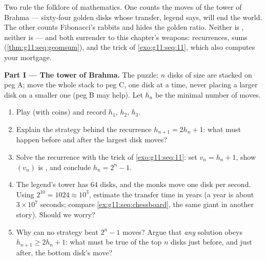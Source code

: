 \begin{problem}
\label{pb:g11:seq:1}
Two  rule the folklore of mathematics. One counts the
moves of the tower of Brahma --- sixty-four golden disks whose
transfer, legend says, will end the world. The other counts
Fibonacci's rabbits and hides the golden ratio. Neither is
, neither is  --- and both surrender to this
chapter's weapons: recurrences,  sums
(\cref{thm:g11:seq:geomsum}), and the  trick of
\cref{exo:g11:seq:11}, which also computes your mortgage.

\medskip
\noindent\textbf{Part I --- The tower of Brahma.}
The puzzle: $n$ disks of  size are stacked on peg A;
move the whole stack to peg C, one disk at a time, never placing
a larger disk on a smaller one (peg B may help). Let $h_n$ be the
minimal number of moves.
\begin{enumerate}
  \item Play (with coins) and record $h_1$, $h_2$, $h_3$.
  \item Explain the strategy behind the recurrence
        $h_{n+1} = 2h_n + 1$: what must happen before and after
        the largest disk moves?
  \item Solve the recurrence with the trick of
        \cref{exo:g11:seq:11}: set $v_n = h_n + 1$, show
        $(v_n)$ is , and conclude $h_n = 2^n - 1$.
  \item The legend's tower has $64$ disks, and the monks move
        one disk per second. Using $2^{10} = 1024 \approx 10^3$,
        estimate the transfer time in years (a year is about
        $3 \times 10^7$ seconds; compare
        \cref{ex:g11:seq:chessboard}, the same giant in another
        story). Should we worry?
  \item Why can no strategy beat $2^n - 1$ moves? Argue that
        \emph{any} solution obeys
        $h_{n+1} \geq 2 h_n + 1$: what must be true of the top
        $n$ disks just before, and just after, the bottom disk's
        move?
\end{enumerate}


\end{problem}
